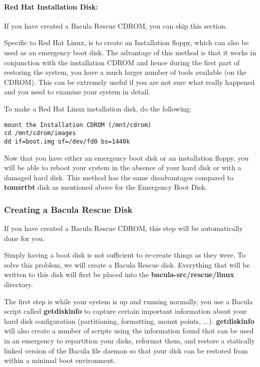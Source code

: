 \paragraph*{Red Hat Installation Disk:}

If you have created a Bacula Rescue CDROM, you can skip this section. 

Specific to Red Hat Linux, is to create an Installation floppy, which can also
be used as an emergency boot disk. The advantage of this method is that it
works in conjunction with the installation CDROM and hence during the first
part of restoring the system, you have a much larger number of tools available
(on the CDROM). This can be extremely useful if you are not sure what really
happened and you need to examine your system in detail. 

To make a Red Hat Linux installation disk, do the following: 

\footnotesize
\begin{verbatim}
mount the Installation CDROM (/mnt/cdrom)
cd /mnt/cdrom/images
dd if=boot.img of=/dev/fd0 bs=1440k
\end{verbatim}
\normalsize

Now that you have either an emergency boot disk or an installation floppy, you
will be able to reboot your system in the absence of your hard disk or with a
damaged hard disk. This method has the same disadvantages compared to {\bf
tomsrtbt} disk as mentioned above for the Emergency Boot Disk. 

\subsubsection*{Creating a Bacula Rescue Disk}

If you have created a Bacula Rescue CDROM, this step will be automatically
done for you. 

Simply having a boot disk is not sufficient to re-create things as they were.
To solve this problem, we will create a Bacula Rescue disk. Everything that
will be written to this disk will first be placed into the {\bf
\lt{}bacula-src\gt{}/rescue/linux} directory. 

The first step is while your system is up and running normally, you use a
Bacula script called {\bf getdiskinfo} to capture certain important
information about your hard disk configuration (partitioning, formatting,
mount points, ...). {\bf getdiskinfo} will also create a number of scripts
using the information found that can be used in an emergency to repartition
your disks, reformat them, and restore a statically linked version of the
Bacula file daemon so that your disk can be restored from within a minimal
boot environment. 


